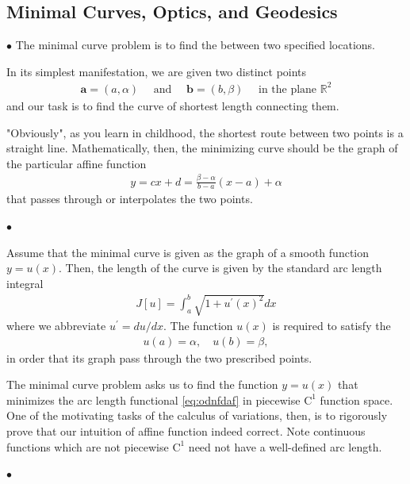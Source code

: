\documentclass{article}
\begin{document}
\subsection{Minimal Curves, Optics, and Geodesics}
$\bullet$  The minimal curve problem is to find the  between two specified locations. 

In its simplest manifestation, we are given two distinct points
\begin{align*}
\mathbf{a}=(a, \alpha) \quad \text { and } \quad \mathbf{b}=(b, \beta) \quad \text { in the plane } \mathbb{R}^{2}
\end{align*}
and our task is to find the curve of shortest length connecting them. 
\begin{rema}
"Obviously", as you learn in childhood, the shortest route between two points is a straight line. Mathematically, then, the minimizing curve should be the graph of the particular affine function 
\begin{align*}
y=c x+d=\frac{\beta-\alpha}{b-a}(x-a)+\alpha
\end{align*}
that passes through or interpolates the two points. 
\end{rema}
$\bullet$  

Assume that the minimal curve is given as the graph of a smooth function $y=u(x)$. Then, the length of the curve is given by the standard arc length integral
\begin{align}
J[u]=\int_{a}^{b} \sqrt{1+u^{\prime}(x)^{2}} d x \label{eq:odnfdaf}
\end{align}
where we abbreviate $u^{\prime}=d u / d x$. The function $u(x)$ is required to satisfy the 
\begin{align*}
u(a)=\alpha, \quad u(b)=\beta,
\end{align*}
in order that its graph pass through the two prescribed points. 
\begin{rema}
The minimal curve problem asks us to find the function $y=u(x)$ that minimizes the arc length functional \cref{eq:odnfdaf} in piecewise $\mathrm{C}^{1}$ function space. One of the motivating tasks of the calculus of variations, then, is to rigorously prove that our  intuition of affine function indeed correct. Note continuous functions which are not piecewise $\mathrm{C}^{1}$ need not have a well-defined arc length. 
\end{rema}
$\bullet$ 
\end{document}
